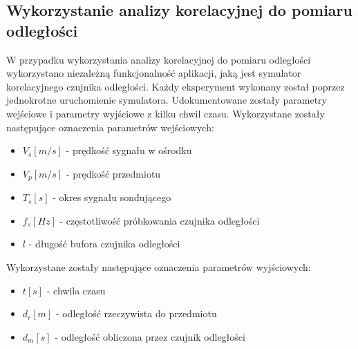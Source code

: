 \documentclass{article}
\begin{document}
        \subsection{Wykorzystanie analizy korelacyjnej do pomiaru odległości} {
            W przypadku wykorzystania analizy korelacyjnej do pomiaru odległości wykorzystano
            niezależną funkcjonalność aplikacji, jaką jest symulator korelacyjnego czujnika
            odległości. Każdy eksperyment wykonany został poprzez jednokrotne uruchomienie
            symulatora. Udokumentowane zostały parametry wejściowe i parametry wyjściowe z
            kilku chwil czasu. Wykorzystane zostały następujące oznaczenia parametrów
            wejściowych:
            \begin{itemize}
                \item $V_s[m/s]$ - prędkość sygnału w ośrodku
                \item $V_p[m/s]$ - prędkość przedmiotu
                \item $T_s[s]$ - okres sygnału sondującego
                \item $f_s[Hz]$ - częstotliwość próbkowania czujnika odległości
                \item $l$ - długość bufora czujnika odległości
            \end{itemize}
            Wykorzystane zostały następujące oznaczenia parametrów wyjściowych:
            \begin{itemize}
                \item $t[s]$ - chwila czasu
                \item $d_r[m]$ - odległość rzeczywista do przedmiotu
                \item $d_m[s]$ - odległość obliczona przez czujnik odległości
            \end{itemize}
        }
\newpage
\end{document}

